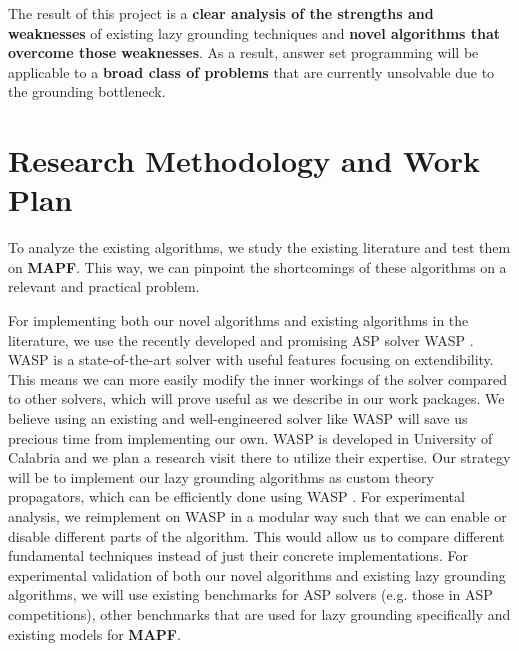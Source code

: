 \documentclass[a4paper,11pt]{article}
\newcommand{\alphasolver}{\logicname{alpha}}
\def\mapf{{\bf MAPF}\xspace}
\begin{document}
\begin{framefloat}[h]
The result of this project is a \textbf{clear analysis of the strengths and weaknesses} of existing lazy grounding techniques and \textbf{novel algorithms that overcome those weaknesses}. As a result, answer set programming will be applicable to a \textbf{broad class of problems} that are currently unsolvable due to the grounding bottleneck.
\end{framefloat}


 

\section{Research Methodology and Work Plan}
To analyze the existing algorithms, we study the existing literature and test them on \mapf. This way, we can pinpoint the shortcomings of these algorithms on a relevant and practical problem.


For implementing both our novel algorithms and existing algorithms in the literature, we use the recently developed and promising ASP solver WASP . WASP is a state-of-the-art solver with useful features focusing on extendibility. This means we can more easily modify the inner workings of the solver compared to other solvers, which will prove useful as we describe in our work packages. We believe using an existing and well-engineered solver like WASP will save us precious time from implementing our own. WASP is developed in University of Calabria and we plan a research visit there to utilize their expertise. Our strategy will be to implement our lazy grounding algorithms as custom theory propagators, which can be efficiently done using WASP .
For experimental analysis, we reimplement \alphasolver  on WASP in a modular way such that we can enable or disable different parts of the algorithm. This would allow us to compare different fundamental techniques instead of just their concrete implementations. 
For experimental validation of both our novel algorithms and existing lazy grounding algorithms, we will use existing benchmarks for ASP solvers  (e.g. those in ASP competitions), other benchmarks that are used for lazy grounding specifically and existing models for \mapf.
\end{document}
